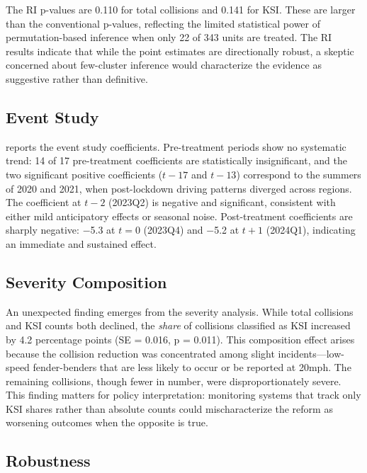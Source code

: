 \documentclass[12pt]{article}
\begin{document}
The RI p-values are 0.110 for total collisions and 0.141 for KSI. These are larger than the conventional p-values, reflecting the limited statistical power of permutation-based inference when only 22 of 343 units are treated. The RI results indicate that while the point estimates are directionally robust, a skeptic concerned about few-cluster inference would characterize the evidence as suggestive rather than definitive.

\subsection{Event Study}



 reports the event study coefficients. Pre-treatment periods show no systematic trend: 14 of 17 pre-treatment coefficients are statistically insignificant, and the two significant positive coefficients ($t-17$ and $t-13$) correspond to the summers of 2020 and 2021, when post-lockdown driving patterns diverged across regions. The coefficient at $t-2$ (2023Q2) is negative and significant, consistent with either mild anticipatory effects or seasonal noise. Post-treatment coefficients are sharply negative: $-$5.3 at $t=0$ (2023Q4) and $-$5.2 at $t+1$ (2024Q1), indicating an immediate and sustained effect.

\subsection{Severity Composition}

An unexpected finding emerges from the severity analysis. While total collisions and KSI counts both declined, the \emph{share} of collisions classified as KSI increased by 4.2 percentage points (SE = 0.016, p = 0.011). This composition effect arises because the collision reduction was concentrated among slight incidents---low-speed fender-benders that are less likely to occur or be reported at 20mph. The remaining collisions, though fewer in number, were disproportionately severe. This finding matters for policy interpretation: monitoring systems that track only KSI shares rather than absolute counts could mischaracterize the reform as worsening outcomes when the opposite is true.

\subsection{Robustness}
\end{document}
